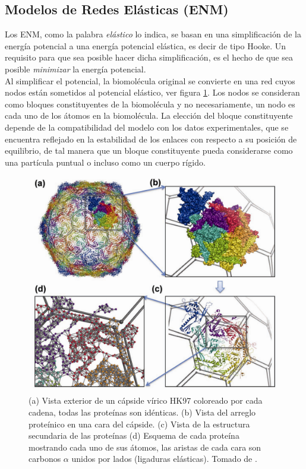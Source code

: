 \subsection{Modelos de Redes El\'{a}sticas (ENM)}
Los ENM, como la palabra \textit{el\'{a}stico} lo indica, se basan en una simplificaci\'{o}n de la energ\'{i}a potencial a una energ\'{i}a potencial el\'{a}stica, es decir de tipo Hooke. Un requisito para que sea posible hacer dicha simplificaci\'{o}n, es el hecho de que sea posible \textit{minimizar} la energ\'{i}a potencial.\\

Al simplificar el potencial, la biomol\'{e}cula original se convierte en una red cuyos nodos est\'{a}n sometidos al potencial el\'{a}stico, ver figura \ref{fig:pan}. Los nodos se consideran como bloques constituyentes de la biomol\'{e}cula y no necesariamente, un nodo es cada uno de los \'{a}tomos en la biomol\'{e}cula. La elecci\'{o}n del bloque constituyente depende de la compatibilidad del modelo con los datos experimentales, que se encuentra reflejado en la estabilidad de los enlaces con respecto a su posici\'{o}n de equilibrio, de tal manera que un bloque constituyente pueda considerarse como una part\'{i}cula puntual o incluso como un cuerpo r\'{i}gido. \\
\begin{figure}
\centering%
\includegraphics[scale=0.3]{Kap2/dibujo.pdf}%
\caption{ (a) Vista exterior de un c\'{a}pside v\'{i}rico HK97 coloreado por cada cadena, todas las prote\'{i}nas son id\'{e}nticas. (b) Vista del arreglo prote\'{i}nico en una cara del c\'{a}pside. (c) Vista de la estructura secundaria de las prote\'{i}nas (d) Esquema de cada prote\'{i}na mostrando cada uno de sus \'{a}tomos, las aristas de cada cara son carbonos $\alpha$ unidos por lados (ligaduras el\'{a}sticas). Tomado de \cite{Lezon2009ElasticViruses}.} \label{fig:pan}
\end{figure}
